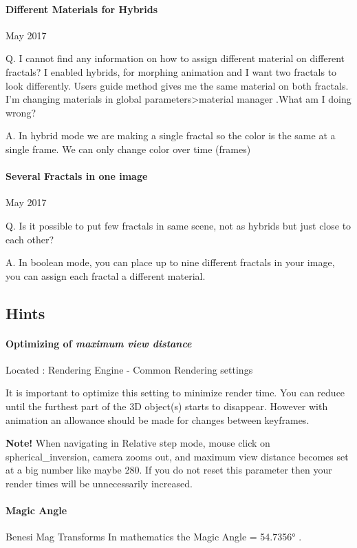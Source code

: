\paragraph{Different Materials for Hybrids} May 2017

Q. I cannot find any information on how to assign different material on different fractals? I enabled hybrids, for morphing animation and I want two fractals to look differently. Users guide method gives me the same material on both fractals. I'm changing materials in global parameters>material manager .What am I doing wrong?

A. In hybrid mode we are making a single fractal so the color is the same at a single frame. We can only change color over time (frames)

\paragraph{Several Fractals in one image} May 2017

Q.  Is it possible to put few fractals in same scene, not as hybrids but just close to each other?

A. In  boolean mode, you can place up to nine different fractals in your image, you can assign each fractal a different material.

\subsection{Hints}\label{Hints}

\paragraph{Optimizing of \emph{maximum view distance}} Located : Rendering
Engine - Common Rendering settings

It is important to optimize this setting to minimize render time. You can reduce
until the furthest part of the 3D object(s) starts to disappear. However with
animation an allowance should be made for changes between keyframes.

\textbf{Note!} When navigating in Relative step mode, mouse click on
spherical\_inversion, camera zooms out, and maximum view distance becomes set at a big number like maybe 280. If you do not reset this parameter then your render times will be unnecessarily increased.


\paragraph{Magic Angle} Benesi Mag Transforms
In mathematics the Magic Angle = 54.7356° .


